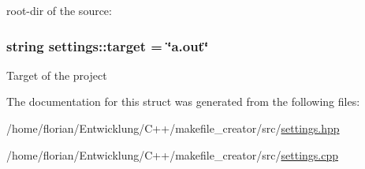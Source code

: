 root-\/dir of the source\-: \hypertarget{structsettings_a9f3ce046370466aa963ce6096b6fcacd}{
\subsubsection[{target}]{\setlength{\rightskip}{0pt plus 5cm}string settings\-::target = \char`\"{}a.\-out\char`\"{}\hspace{0.3cm}{\ttfamily [static]}}}\label{structsettings_a9f3ce046370466aa963ce6096b6fcacd}
Target of the project 

The documentation for this struct was generated from the following files\-:\begin{DoxyCompactItemize}
\item 
/home/florian/\-Entwicklung/\-C++/makefile\-\_\-creator/src/\hyperlink{settings_8hpp}{settings.\-hpp}\item 
/home/florian/\-Entwicklung/\-C++/makefile\-\_\-creator/src/\hyperlink{settings_8cpp}{settings.\-cpp}\end{DoxyCompactItemize}
